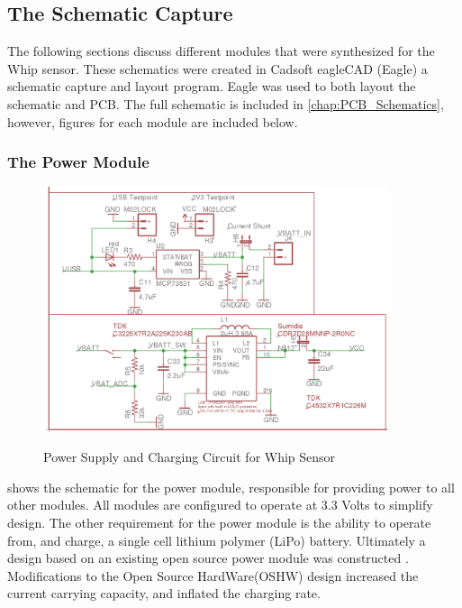 \subsection {The Schematic Capture}
The following sections discuss different modules that were synthesized for the Whip sensor. These schematics were created in Cadsoft eagleCAD (Eagle)\cite{Eagle2017} a schematic capture and layout program. Eagle was used to both layout the schematic and PCB. The full schematic is included in \cref{chap:PCB_Schematics}, however, figures for each module are included below.

\subsubsection {The Power Module}
\begin{figure}
	\begin{center}
		\label{fig:Rev5_power}
		\includegraphics[scale=1,width=0.9\textwidth]{Images/Rev5_PowerSch.png} 
		\caption{Power Supply and Charging Circuit for Whip Sensor}
	\end{center}
\end{figure}

 shows the schematic for the power module, responsible for providing power to all other modules. All modules are configured to operate at 3.3 Volts to simplify design. The other requirement for the power module is the ability to operate from, and charge, a single cell lithium polymer (LiPo) battery. Ultimately a design based on an existing open source power module was constructed \cite{Sparkfun2012}. Modifications to the Open Source HardWare(OSHW) design increased the current carrying capacity, and inflated the charging rate.

